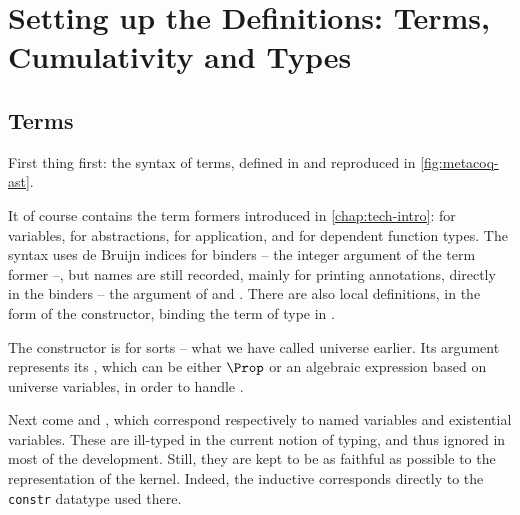 \section[Terms, Cumulativity and Types]{Setting up the Definitions: Terms, Cumulativity and Types}
\label{sec:meta-defs}

\subsection{Terms}

First thing first: the syntax of terms, defined in  and reproduced in \cref{fig:metacoq-ast}.

\begin{figure*}
  \caption{The Abstract Syntax Tree of terms in  ()}
  \label{fig:metacoq-ast}
\end{figure*}

It of course contains  the term formers introduced in \cref{chap:tech-intro}:
 for variables,  for abstractions,
 for application, and  for dependent function types.
The syntax uses de Bruijn indices for binders – the integer argument of the 
term former –, but names are still recorded, mainly for printing annotations, directly in the
binders – the  argument of  and .
There are also local definitions, in the form of the  constructor,
binding the term  of type  in .

The  constructor is for sorts – what we have called universe earlier.
Its  argument represents its , which can be either $\Prop$
or an algebraic expression based on universe variables, in order to handle .

Next come  and , which
correspond respectively to named variables and existential variables.
These are ill-typed in the current notion of typing,
and thus ignored in most of the development. Still, they are kept to be as
faithful as possible to the representation of the  kernel.
Indeed, the inductive  corresponds directly to the
\texttt{constr} datatype used there.%

